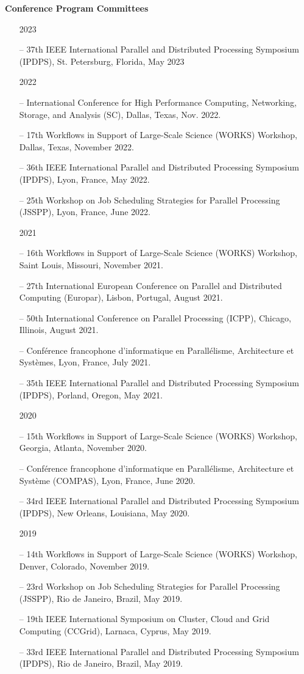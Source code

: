 \documentclass[times,11pt]{letter}
\begin{document}
\noindent
{\bf Conference Program Committees}
\begin{itemize}

\item [2023]
\item [--] 37th IEEE International Parallel and Distributed Processing Symposium (IPDPS), St. Petersburg, Florida, May 2023

\item [2022]
\item[--]  International Conference for High Performance Computing, Networking, Storage, and Analysis (SC), Dallas, Texas, Nov. 2022.
\item[--]  17th Workflows in Support of Large-Scale Science (WORKS) Workshop, Dallas, Texas,  November 2022.
\item [--] 36th IEEE International Parallel and Distributed Processing Symposium (IPDPS), Lyon, France, May 2022.
\item[--]  25th Workshop on Job Scheduling Strategies for Parallel Processing (JSSPP), Lyon, France, June 2022.

\item [2021]
\item[--]  16th Workflows in Support of Large-Scale Science (WORKS) Workshop, Saint Louis, Missouri,  November 2021.
\item [--] 27th International European Conference on Parallel and Distributed Computing (Europar), Lisbon, Portugal, August 2021.
\item [--] 50th International Conference on Parallel Processing  (ICPP), Chicago, Illinois, August 2021.
\item [--] Conf\'erence francophone d'informatique en Parall\'elisme, Architecture et Syst\`emes, Lyon, France, July 2021.
\item [--] 35th IEEE International Parallel and Distributed Processing Symposium (IPDPS), Porland, Oregon, May 2021.

\item [2020]
\item[--]  15th Workflows in Support of Large-Scale Science (WORKS) Workshop, Georgia, Atlanta, November 2020.
\item [--] Conf\'erence francophone d'informatique en Parall\'elisme, Architecture et Syst\`eme (COMPAS), Lyon, France, June 2020.
\item [--] 34rd IEEE International Parallel and Distributed Processing Symposium (IPDPS), New Orleans, Louisiana, May 2020.

\item [2019]
\item[--]  14th Workflows in Support of Large-Scale Science (WORKS) Workshop, Denver, Colorado, November 2019.
\item[--]  23rd Workshop on Job Scheduling Strategies for Parallel Processing (JSSPP), Rio de Janeiro, Brazil, May 2019.
\item[--]  19th IEEE International Symposium on Cluster, Cloud and Grid Computing (CCGrid), Larnaca, Cyprus, May 2019.
\item[--]  33rd IEEE International Parallel and Distributed Processing Symposium (IPDPS), Rio de Janeiro, Brazil, May 2019.


\end{itemize}
\end{document}
